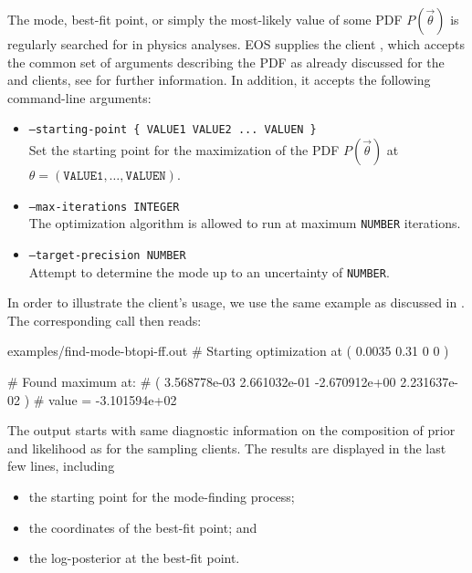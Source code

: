 The mode, best-fit point, or simply the most-likely value of some \gls{PDF}
$P(\vec\theta)$ is regularly searched for in physics analyses. EOS supplies the
client , which accepts the common set of arguments
describing the PDF as already discussed for the  and
 clients, see  for
further information.  In addition, it accepts the following command-line
arguments:
\begin{itemize}
    \item[] \texttt{--starting-point \{ VALUE1 VALUE2 ... VALUEN \}}\\[\medskipamount]
        Set the starting point for the maximization of the PDF $P(\vec\theta)$
        at $\theta = ( \texttt{VALUE1}, \dots, \texttt{VALUEN} )$.
    \item[] \texttt{--max-iterations INTEGER}\\[\medskipamount]
        The optimization algorithm is allowed to run at maximum \texttt{NUMBER} iterations.
    \item[] \texttt{--target-precision NUMBER}\\[\medskipamount]
        Attempt to determine the mode up to an uncertainty of \texttt{NUMBER}.
\end{itemize}

In order to illustrate the client's usage, we use the same example as
discussed in . The corresponding call
then reads:

\begin{filecontents*}{examples/find-mode-btopi-ff.out}
# Starting optimization at ( 0.0035 0.31 0 0 )

# Found maximum at: 
#   ( 3.568778e-03 2.661032e-01 -2.670912e+00 2.231637e-02 )
#   value = -3.101594e+02
\end{filecontents*}
The output starts with same diagnostic information on the composition of
prior and likelihood as for the sampling clients. The results are displayed
in the last few lines, including
\begin{itemize}
    \item the starting point for the mode-finding process;
    \item the coordinates of the best-fit point; and
    \item the log-posterior at the best-fit point.
\end{itemize}

